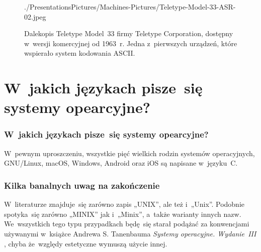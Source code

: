 \documentclass[10pt,t]{beamer}
\begin{document}
\begin{frame}
\begin{figure}
    {./PresentationsPictures/Machines-Pictures/Teletype-Model-33-ASR-02.jpeg}

    \caption{Dalekopis Teletype Model~33 firmy Teletype Corporation,
      dostępny w~wersji komercyjnej od 1963~r. Jedna z~pierwszych urządzeń,
      które wspierało system kodowania ASCII. }

    \label{fig:Teletype-Model-33-ASR}

  \end{figure}

\end{frame}










\section{W~jakich językach pisze~się systemy opearcyjne?}



\begin{frame}
  \frametitle{W~jakich językach pisze~się systemy opearcyjne?}


  W~pewnym uproszczeniu, wszystkie pięć wielkich rodzin systemów
  operacyjnych, GNU/Linux, macOS, Windows, Android oraz iOS są napisane
  w~języku~C.

\end{frame}








\begin{frame}
  \frametitle{Kilka banalnych uwag na zakończenie}


  W~literaturze znajduje~się zarówno zapis „UNIX”, ale też i~„Unix”.
  Podobnie spotyka~się zarówno „MINIX” jak i~„Minix”, a~także warianty
  innych nazw. We~wszystkich tego typu przypadkach będę~się starał podążać
  za konwencjami używanymi w~książce Andrewa S. Tanenbauma \textit{Systemy
    operacyjne. Wydanie~III}
  \parencite{Tannenbaum-Systemy-Operacyjne-Wydanie-III-Pub-2013}, chyba
  że~względy estetyczne wymuszą użycie innej.

\end{frame}
\end{document}
